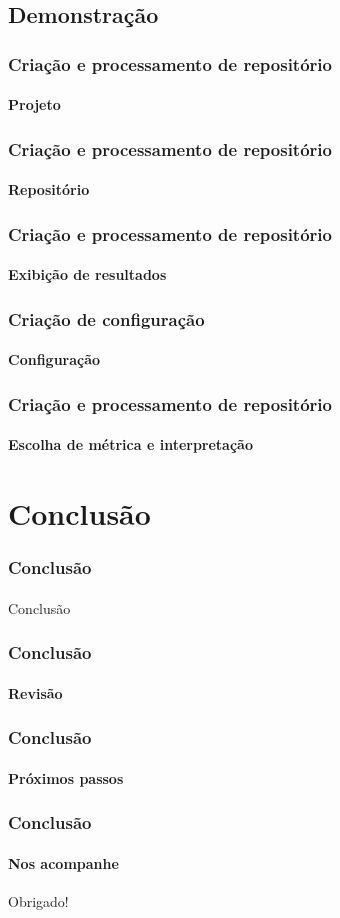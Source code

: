 \documentclass{beamer}
\begin{document}
  \subsection{Demonstração}
  \begin{frame}
    \frametitle{Criação e processamento de repositório}
    \framesubtitle{Projeto}
  \end{frame}

  \begin{frame}
    \frametitle{Criação e processamento de repositório}
    \framesubtitle{Repositório}
  \end{frame}

  \begin{frame}
    \frametitle{Criação e processamento de repositório}
    \framesubtitle{Exibição de resultados}
  \end{frame}

  \begin{frame}
    \frametitle{Criação de configuração}
    \framesubtitle{Configuração}
  \end{frame}

  \begin{frame}
    \frametitle{Criação e processamento de repositório}
    \framesubtitle{Escolha de métrica e interpretação}
  \end{frame}

\section{Conclusão}
\begin{frame}
  \frametitle{Conclusão}
  \framesubtitle{}

  Conclusão
\end{frame}

\begin{frame}
  \frametitle{Conclusão}
  \framesubtitle{Revisão}
\end{frame}

\begin{frame}
  \frametitle{Conclusão}
  \framesubtitle{Próximos passos}
\end{frame}

\begin{frame}
  \frametitle{Conclusão}
  \framesubtitle{Nos acompanhe}

  Obrigado!
\end{frame}
\end{document}
